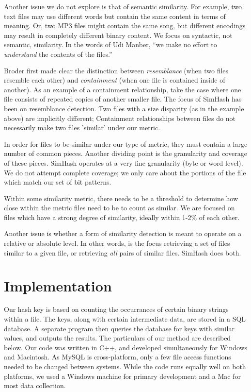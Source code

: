 \documentclass[10pt, twocolumn]{article}
\begin{document}
Another issue we do not explore is that of semantic similarity. For example, two text files may use different words but contain the same content in terms of meaning. Or, two MP3 files might contain the same song, but different encodings may result in completely different binary content.  We focus on syntactic, not semantic, similarity. In the words of Udi Manber, ``we make no effort to \emph{understand} the contents of the files.'' \cite{manber}

Broder \cite{broder} first made clear the distinction between \emph{resemblance} (when two files resemble each other) and \emph{containment} (when one file is contained inside of another). As an example of a containment relationship, take the case where one file consists of repeated copies of another smaller file. The focus of SimHash has been on resemblance detection. Two files with a size disparity (as in the example above) are implicitly different; Containment relationships between files do not necessarily make two files 'similar' under our metric.

In order for files to be similar under our type of metric, they must contain a large number of common pieces. Another dividing point is the granularity and coverage of these pieces. SimHash operates at a very fine granularity (byte or word level). We do not attempt complete coverage; we only care about the portions of the file which match our set of bit patterns.

Within some similarity metric, there needs to be a threshold to determine how close within the metric files need to be to count as similar. We are focused on files which have a strong degree of similarity, ideally within 1-2\% of each other.

Another issue is whether a form of similarity detection is meant to operate on a relative or absolute level. In other words, is the focus retrieving a set of files similar to a given file, or retrieving \emph{all} pairs of similar files. SimHash does both.


\section{Implementation}

Our hash key is based on counting the occurrances of certain binary strings within a file.  The keys, along with certain intermediate data, are stored in a SQL database.  A separate program then queries the database for keys with similar values, and outputs the results.  The particulars of our method are described below.  Our code was written in C++, and developed simultaneously for Windows and Macintosh.  As MySQL is cross-platform, only a few file access functions needed to be changed between systems.  While the code runs equally well on both platforms, we used a Windows machine for primary development and a Mac for most data collection.
\end{document}

